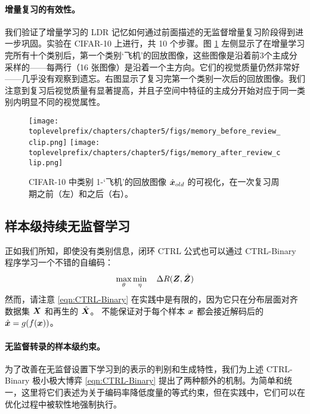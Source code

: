 \documentclass[../../book-main_zh.tex]{subfiles}
\begin{document}
\paragraph{增量复习的有效性。}
我们验证了增量学习的 LDR 记忆如何通过前面描述的无监督增量复习阶段得到进一步巩固。实验在 CIFAR-10 上进行，共 10 个步骤。图 \ref{fig:memory_review} 左侧显示了在增量学习完所有十个类别后，第一个类别‘飞机’的回放图像，这些图像是沿着前3个主成分采样的——每两行（16 张图像）是沿着一个主方向。它们的视觉质量仍然非常好——几乎没有观察到遗忘。右图显示了复习完第一个类别一次后的回放图像。我们注意到复习后视觉质量有显著提高，并且子空间中特征的主成分开始对应于同一类别内明显不同的视觉属性。

\begin{figure}
\centering
\texttt{[image: \\toplevelprefix/chapters/chapter5/figs/memory\_before\_review\_clip.png]}
\texttt{[image: \\toplevelprefix/chapters/chapter5/figs/memory\_after\_review\_clip.png]}
 \caption{\small CIFAR-10 中类别 1-‘飞机’的回放图像 $\hat{\bm{x}}_{old}$ 的可视化，在一次复习周期之前（左）和之后（右）。} 
\label{fig:memory_review}
\end{figure}


\subsection{样本级持续无监督学习}
\label{sec:sample-wise-incremental}

正如我们所知，即使没有类别信息，闭环 CTRL 公式也可以通过 CTRL-Binary 程序学习一个不错的自编码：
\begin{align}
      \max_\theta \min_\eta \quad \Delta R(\bm{Z}, \hat{\bm{Z}}) 
 \label{eqn:CTRL-Binary}
\end{align}
然而，请注意 \eqref{eqn:CTRL-Binary} 在实践中是有限的，因为它只在分布层面对齐数据集 $\bm{X}$ 和再生的 $\hat {\bm{X}}$。
不能保证对于每个样本 $\bm{x}$ 都会接近解码后的 $\hat {\bm{x}} = g(f(\bm{x}))$。

\paragraph{无监督转录的样本级约束。} 
\label{sec:constraints}
为了改善在无监督设置下学习到的表示的判别和生成特性，我们为上述 CTRL-Binary 极小极大博弈 \eqref{eqn:CTRL-Binary} 提出了两种额外的机制。为简单和统一，这里将它们表述为关于编码率降低度量的等式约束，但在实践中，它们可以在优化过程中被软性地强制执行。
\end{document}
